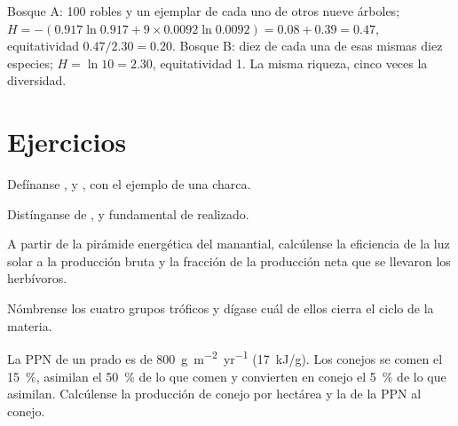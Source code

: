 \begin{example}\label{ex:b1:ecosystem-organization:twowoods}
Bosque A: 100 robles y un ejemplar de cada uno de otros nueve árboles;
$H = -(0.917\ln
0.917 + 9\times 0.0092\ln 0.0092) = 0.08 + 0.39 = 0.47$,
equitatividad $0.47/2.30 = 0.20$. Bosque B: diez de cada una de esas mismas
diez especies; $H =
\ln 10 = 2.30$, equitatividad 1. La misma riqueza, cinco
veces la diversidad.
\end{example}

\section{Ejercicios}

\begin{exercise}[$\star$]\label{exo:b1:ecosystem-organization:1}
Defínanse ,  y , con el ejemplo de una charca.
\end{exercise}

\begin{exercise}[$\star$]\label{exo:b1:ecosystem-organization:2}
Distínganse  de , y  fundamental de  realizado.
\end{exercise}

\begin{exercise}[$\star$]\label{exo:b1:ecosystem-organization:3}
A partir de la pirámide energética del manantial, calcúlense la eficiencia
de la luz solar a la producción bruta y la fracción de la producción neta
que se llevaron los herbívoros.
\end{exercise}

\begin{exercise}[$\star$]\label{exo:b1:ecosystem-organization:4}
Nómbrense los cuatro grupos tróficos y dígase cuál de ellos cierra el ciclo
de la materia.
\end{exercise}

\begin{exercise}[$\star\star$]\label{exo:b1:ecosystem-organization:5}
La PPN de un prado es de \qty{800}{g.m^{-2}.yr^{-1}} (\qty{17}{kJ/g}). Los
conejos se comen el \qty{15}{\%}, asimilan el \qty{50}{\%} de lo que comen y
convierten en conejo el \qty{5}{\%} de lo que asimilan. Calcúlense la
producción de conejo por hectárea y la  de la PPN al
conejo.
\end{exercise}

